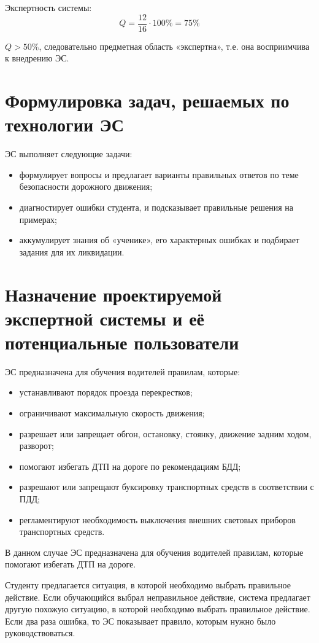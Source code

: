 Экспертность системы:
$$ Q = \frac{12}{16} \cdot 100\% = 75 \% $$

$Q > 50\%$, следовательно предметная область «экспертна», т.е. она восприимчива к внедрению ЭС.

\section{Формулировка задач, решаемых по технологии ЭС}

ЭС выполняет следующие задачи:
\begin{itemize}
	\item формулирует вопросы и предлагает варианты правильных ответов по теме безопасности дорожного движения;
	\item диагностирует ошибки студента, и подсказывает правильные решения на примерах;
	\item аккумулирует знания об «ученике», его характерных ошибках и подбирает задания для их ликвидации.
\end{itemize}

\section{Назначение проектируемой экспертной системы и её потенциальные	пользователи}

ЭС предназначена для обучения водителей правилам, которые:
\begin{itemize}
	\item устанавливают порядок проезда перекрестков;
	\item ограничивают максимальную скорость движения;
	\item разрешает или запрещает обгон, остановку, стоянку, движение задним ходом, разворот;
	\item помогают избегать ДТП на дороге по рекомендациям БДД;
	\item разрешают или запрещают буксировку транспортных средств в соответствии с ПДД;
	\item регламентируют необходимость выключения внешних световых приборов транспортных средств.
\end{itemize}

В данном случае ЭС предназначена для обучения водителей правилам, которые помогают избегать ДТП на дороге.

Студенту предлагается ситуация, в которой необходимо выбрать правильное действие. Если обучающийся выбрал неправильное действие, система предлагает другую похожую ситуацию, в которой необходимо выбрать правильное действие. Если два раза ошибка, то ЭС показывает правило, которым нужно было руководствоваться.

